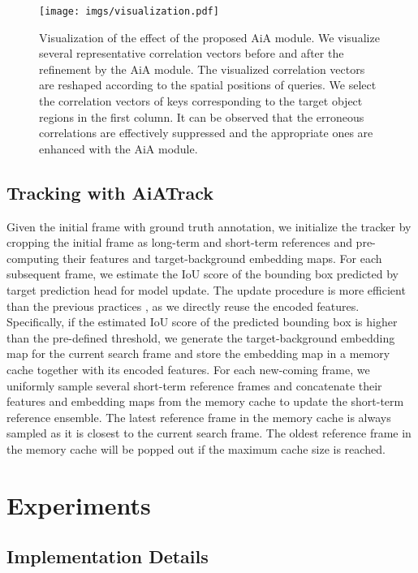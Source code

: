 \documentclass[runningheads]{llncs}
\begin{document}
\begin{figure}[t]
\centering
\texttt{[image: imgs/visualization.pdf]}
\caption{Visualization of the effect of the proposed AiA module. We visualize several representative correlation vectors before and after the refinement by the AiA module. The visualized correlation vectors are reshaped according to the spatial positions of queries. We select the correlation vectors of keys corresponding to the target object regions in the first column. It can be observed that the erroneous correlations are effectively suppressed and the appropriate ones are enhanced with the AiA module.}
\label{figure-visualization}
\end{figure}

\subsection{Tracking with AiATrack}\label{section-tracking}
Given the initial frame with ground truth annotation, we initialize the tracker by cropping the initial frame as long-term and short-term references and pre-computing their features and target-background embedding maps. For each subsequent frame, we estimate the IoU score of the bounding box predicted by target prediction head for model update. The update procedure is more efficient than the previous practices \cite{fu2021stmtrack,wang2021transformer,yan2021learning}, as we directly reuse the encoded features. Specifically, if the estimated IoU score of the predicted bounding box is higher than the pre-defined threshold, we generate the target-background embedding map for the current search frame and store the embedding map in a memory cache together with its encoded features. For each new-coming frame, we uniformly sample several short-term reference frames and concatenate their features and embedding maps from the memory cache to update the short-term reference ensemble. The latest reference frame in the memory cache is always sampled as it is closest to the current search frame. The oldest reference frame in the memory cache will be popped out if the maximum cache size is reached.

\section{Experiments}

\subsection{Implementation Details}
\end{document}

